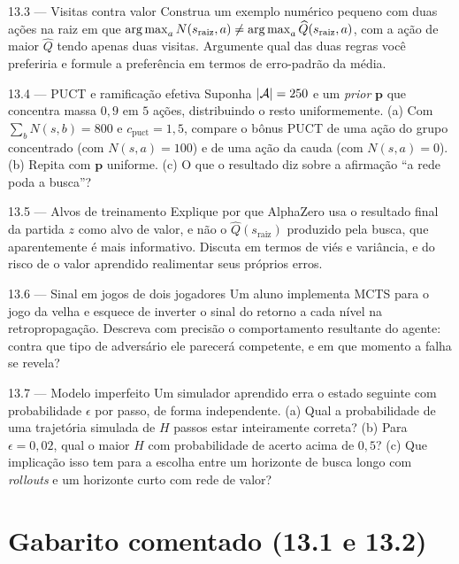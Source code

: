 \documentclass[a4paper, 11pt]{article}
\newcommand{\Nv}[1]{N(#1)}
\newcommand{\Qh}{\widehat{Q}}
\newcommand{\raiz}{s_{\mathrm{raiz}}}
\begin{document}
\begin{exbox}{13.3 --- Visitas contra valor}
Construa um exemplo numérico pequeno com duas ações na raiz em que
$\argmax_a \Nv{\raiz,a} \neq \argmax_a \Qh(\raiz,a)$, com a ação de maior $\Qh$
tendo apenas duas visitas. Argumente qual das duas regras você preferiria e
formule a preferência em termos de erro-padrão da média.
\end{exbox}

\begin{exbox}{13.4 --- PUCT e ramificação efetiva}
Suponha $\lvert\mathcal{A}\rvert=250$ e um \emph{prior} $\bm{p}$ que concentra massa $0{,}9$
em $5$ ações, distribuindo o resto uniformemente. (a) Com $\sum_b \Nv{s,b}=800$
e $c_{\text{puct}}=1{,}5$, compare o bônus PUCT de uma ação do grupo
concentrado (com $\Nv{s,a}=100$) e de uma ação da cauda (com $\Nv{s,a}=0$).
(b) Repita com $\bm{p}$ uniforme. (c) O que o resultado diz sobre a afirmação
``a rede poda a busca''?
\end{exbox}

\begin{exbox}{13.5 --- Alvos de treinamento}
Explique por que AlphaZero usa o resultado final da partida $z$ como alvo de
valor, e não o $\Qh(\raiz)$ produzido pela busca, que aparentemente é mais
informativo. Discuta em termos de viés e variância, e do risco de o valor
aprendido realimentar seus próprios erros.
\end{exbox}

\begin{exbox}{13.6 --- Sinal em jogos de dois jogadores}
Um aluno implementa MCTS para o jogo da velha e esquece de inverter o sinal do
retorno a cada nível na retropropagação. Descreva com precisão o comportamento
resultante do agente: contra que tipo de adversário ele parecerá competente, e
em que momento a falha se revela?
\end{exbox}

\begin{exbox}{13.7 --- Modelo imperfeito}
Um simulador aprendido erra o estado seguinte com probabilidade $\epsilon$ por
passo, de forma independente. (a) Qual a probabilidade de uma trajetória
simulada de $H$ passos estar inteiramente correta? (b) Para $\epsilon=0{,}02$,
qual o maior $H$ com probabilidade de acerto acima de $0{,}5$? (c) Que
implicação isso tem para a escolha entre um horizonte de busca longo com
\emph{rollouts} e um horizonte curto com rede de valor?
\end{exbox}

\section{Gabarito comentado (13.1 e 13.2)}
\end{document}
